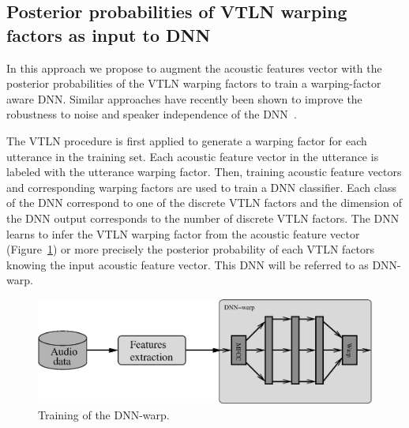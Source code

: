 \documentclass{nle}
\begin{document}
\subsection{Posterior probabilities of VTLN warping factors as input to DNN}
In this  approach we propose  to augment the acoustic  features vector
with the posterior probabilities of  the VTLN warping factors to train
a warping-factor  aware DNN.   Similar approaches have  recently been
shown  to  improve the  robustness  to noise and  speaker  independence of  the
DNN~\citep{export:194344,42536}.

The VTLN procedure is first applied to generate a warping factor for
each  utterance in the  training set. Each acoustic feature vector in the utterance is labeled with the utterance warping factor. Then, training acoustic feature vectors and corresponding warping factors are used to train a DNN classifier. Each class of the DNN correspond to one of the discrete VTLN factors and the dimension of the DNN output corresponds to the number of discrete VTLN factors. The DNN learns to infer the VTLN warping factor from the acoustic feature vector (Figure~\ref{fig1}) or more precisely the posterior probability of each VTLN factors knowing the input acoustic feature vector. This DNN will be referred to as DNN-warp.
\begin{figure}
       \includegraphics[width=\textwidth]{fig1}
        \caption{Training of the DNN-warp.} 
   	\label{fig1}
\end{figure}

%
\end{document}
